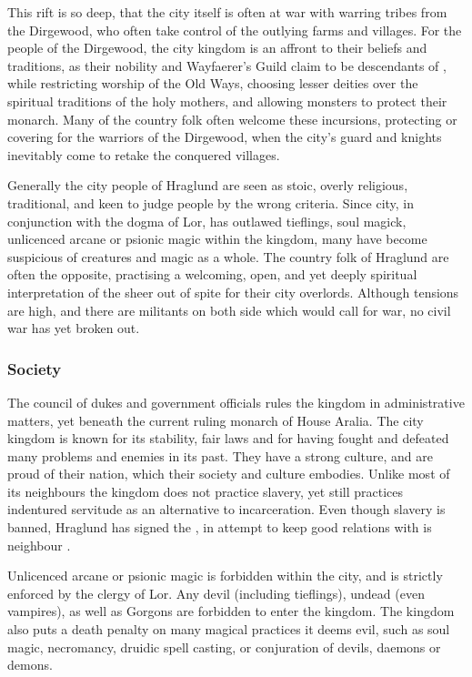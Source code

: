 This rift is so deep, that the city itself is often at war with warring tribes
from the Dirgewood, who often take control of the outlying farms and
villages. For the people of the Dirgewood, the city kingdom is an affront to
their beliefs and traditions, as their nobility and Wayfaerer's Guild claim to
be descendants of , while restricting worship of the Old
Ways, choosing lesser deities over the spiritual traditions of the holy
mothers, and allowing monsters to protect their monarch. Many of the country
folk often welcome these incursions, protecting or covering for the warriors
of the Dirgewood, when the city's guard and knights inevitably come to retake
the conquered villages.

Generally the city people of Hraglund are seen as stoic, overly religious,
traditional, and keen to judge people by the wrong criteria. Since city, in
conjunction with the dogma of Lor, has outlawed tieflings, soul magick,
unlicenced arcane or psionic magic within the kingdom, many have become
suspicious of creatures and magic as a whole. The country folk of Hraglund are
often the opposite, practising a welcoming, open, and yet deeply spiritual
interpretation of the  sheer out of spite for their city
overlords. Although tensions are high, and there are militants on both side
which would call for war, no civil war has yet broken out.

\subsubsection{Society}

The council of dukes and government officials rules the kingdom in
administrative matters, yet beneath the current ruling monarch of House
Aralia. The city kingdom is known for its stability, fair laws and for having
fought and defeated many problems and enemies in its past. They have a strong
culture, and are proud of their nation, which their society and culture
embodies. Unlike most of its neighbours the kingdom does not practice slavery,
yet still practices indentured servitude as an alternative to
incarceration. Even though slavery is banned, Hraglund has signed the
, in attempt to keep good relations with is
neighbour .

Unlicenced arcane or psionic magic is forbidden within the city, and is
strictly enforced by the clergy of Lor. Any devil (including tieflings),
undead (even vampires), as well as Gorgons are forbidden to enter the kingdom.
The kingdom also puts a death penalty on many magical practices it deems evil,
such as soul magic, necromancy, druidic spell casting, or conjuration of
devils, daemons or demons.

